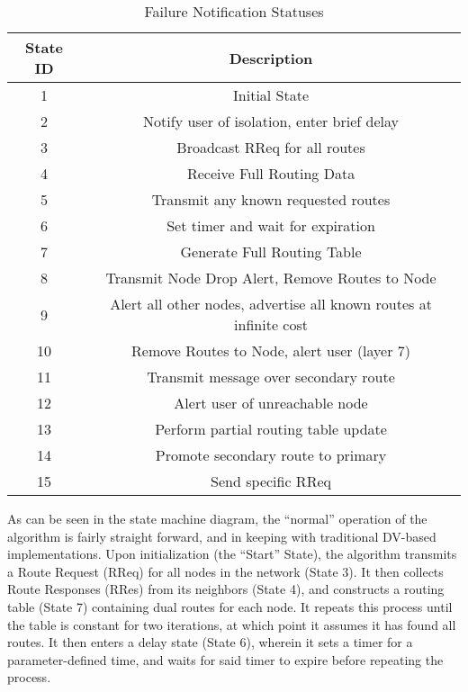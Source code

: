 \begin{table}[h]
    \centering\begin{tabular}{|c|c|}
        \hline
        State ID & Description \\
        \hline
        \hline
        1 & Initial State \\
        \hline
        2 & Notify user of isolation, enter brief delay \\
        \hline
        3 & Broadcast RReq for all routes \\
        \hline
        4 & Receive Full Routing Data \\
        \hline
        5 & Transmit any known requested routes \\
        \hline
        6 & Set timer and wait for expiration \\
        \hline
        7 & Generate Full Routing Table \\
        \hline
        8 & Transmit Node Drop Alert, Remove Routes to Node\\
        \hline
        9 & Alert all other nodes, advertise all known routes at infinite cost \\
        \hline
        10 & Remove Routes to Node, alert user (layer 7) \\
        \hline
        11 & Transmit message over secondary route \\
        \hline
        12 & Alert user of unreachable node \\
        \hline
        13 & Perform partial routing table update \\
        \hline
        14 & Promote secondary route to primary \\
        \hline
        15 & Send specific RReq \\
        \hline

    \end{tabular}
    \caption{Failure Notification Statuses}
    \label{table:FSMDescriptions}
\end{table}

As can be seen in the state machine diagram, the ``normal'' operation of the algorithm is fairly straight forward, and in keeping with traditional DV-based implementations. Upon initialization (the ``Start'' State), the algorithm transmits a Route Request (RReq) for all nodes in the network (State 3). It then collects Route Responses (RRes) from its neighbors (State 4), and constructs a routing table (State 7) containing dual routes for each node. It repeats this process until the table is constant for two iterations, at which point it assumes it has found all routes. It then enters a delay state (State 6), wherein it sets a timer for a parameter-defined time, and waits for said timer to expire before repeating the process.

